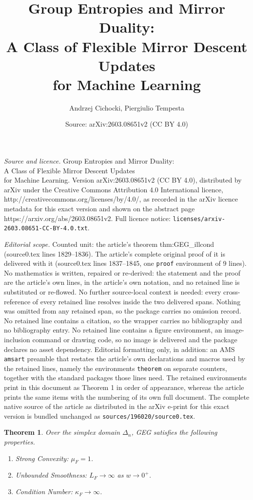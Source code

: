 \documentclass[10pt,a4paper]{amsart}
\title{Group Entropies and Mirror Duality:\\ A Class of Flexible Mirror Descent Updates \\ for Machine Learning}
\author{Andrzej Cichocki, Piergiulio Tempesta}
\date{Source: arXiv:2603.08651v2 (CC BY 4.0)}
\newtheorem{theorem}{Theorem}
\begin{document}
\maketitle

\noindent\emph{Source and licence.} Group Entropies and Mirror Duality:\\ A Class of Flexible Mirror Descent Updates \\ for Machine Learning. Version arXiv:2603.08651v2 (CC BY 4.0), distributed by arXiv under the Creative Commons Attribution 4.0 International licence, http://creativecommons.org/licenses/by/4.0/, as recorded in the arXiv licence metadata for this exact version and shown on the abstract page https://arxiv.org/abs/2603.08651v2. Full licence notice: \texttt{licenses/arxiv-2603.08651-CC-BY-4.0.txt}.\par\smallskip

\noindent\textit{Editorial scope.} Counted unit: the article's theorem thm:GEG\_illcond (source0.tex lines 1829--1836). The article's complete original proof of it is delivered with it (source0.tex lines 1837--1845, one \texttt{proof} environment of 9 lines). No mathematics is written, repaired or re-derived: the statement and the proof are the article's own lines, in the article's own notation, and no retained line is substituted or re-flowed.  No further source-local context is needed: every cross-reference of every retained line resolves inside the two delivered spans.  Nothing was omitted from any retained span, so the package carries no omission record.  No retained line contains a citation, so the wrapper carries no bibliography and no bibliography entry.  No retained line contains a figure environment, an image-inclusion command or drawing code, so no image is delivered and the package declares no asset dependency.  Editorial formatting only, in addition: an AMS \texttt{amsart} preamble that restates the article's own declarations and macros used by the retained lines, namely the environments \texttt{theorem} on separate counters, together with the standard packages those lines need.  The retained environments print in this document as Theorem 1 in order of appearance, whereas the article prints the same items with the numbering of its own full document.  The complete native source of the article as distributed in the arXiv e-print for this exact version is bundled unchanged as \texttt{sources/196020/source0.tex}.
\begin{theorem} \label{thm:GEG_illcond}
Over the simplex domain $\Delta_n$, GEG satisfies the following properties.
\begin{enumerate}
    \item \textit{Strong Convexity:} $\mu_F = 1$. %
    \item \textit{Unbounded Smoothness:} $L_F \to \infty$ as $w \to 0^+$.
    \item \textit{Condition Number:} $\kappa_F \to \infty$.
\end{enumerate}
\end{theorem}
\end{document}
